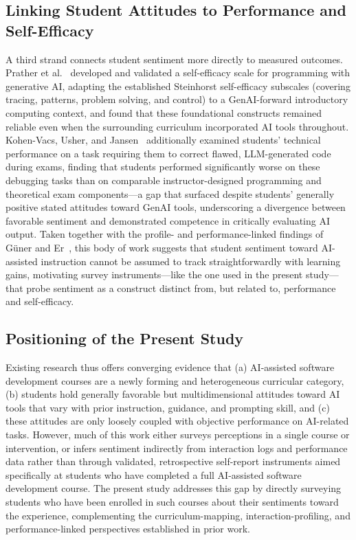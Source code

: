 \documentclass[sigconf]{acmart}
\begin{document}
\subsection{Linking Student Attitudes to Performance and Self-Efficacy}

A third strand connects student sentiment more directly to measured outcomes.
Prather et al.~\cite{prather2026validated} developed and validated a
self-efficacy scale for programming with generative AI, adapting the
established Steinhorst self-efficacy subscales (covering tracing, patterns,
problem solving, and control) to a GenAI-forward introductory computing
context, and found that these foundational constructs remained reliable even
when the surrounding curriculum incorporated AI tools throughout. Kohen-Vacs,
Usher, and Jansen~\cite{kohenvacs2025integrating} additionally examined
students' technical performance on a task requiring them to correct flawed,
LLM-generated code during exams, finding that students performed significantly
worse on these debugging tasks than on comparable instructor-designed
programming and theoretical exam components---a gap that surfaced despite
students' generally positive stated attitudes toward GenAI tools, underscoring
a divergence between favorable sentiment and demonstrated competence in
critically evaluating AI output. Taken together with the profile- and
performance-linked findings of G\"uner and Er~\cite{guner2025classroom}, this
body of work suggests that student sentiment toward AI-assisted instruction
cannot be assumed to track straightforwardly with learning gains, motivating
survey instruments---like the one used in the present study---that probe
sentiment as a construct distinct from, but related to, performance and
self-efficacy.

\subsection{Positioning of the Present Study}

Existing research thus offers converging evidence that (a) AI-assisted software
development courses are a newly forming and heterogeneous curricular category,
(b) students hold generally favorable but multidimensional attitudes toward AI
tools that vary with prior instruction, guidance, and prompting skill, and (c)
these attitudes are only loosely coupled with objective performance on
AI-related tasks. However, much of this work either surveys perceptions in a
single course or intervention, or infers sentiment indirectly from interaction
logs and performance data rather than through validated, retrospective
self-report instruments aimed specifically at students who have completed a
full AI-assisted software development course. The present study addresses this
gap by directly surveying students who have been enrolled in such courses about
their sentiments toward the experience, complementing the curriculum-mapping,
interaction-profiling, and performance-linked perspectives established in prior
work.
\end{document}
